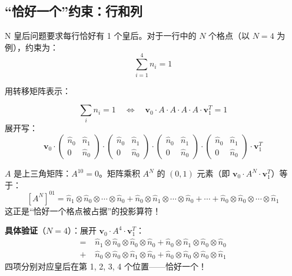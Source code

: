 \documentclass[12pt,a4paper]{article}
\begin{document}
\subsection{``恰好一个''约束：行和列}

N 皇后问题要求每行恰好有 1 个皇后。对于一行中的 $N$ 个格点（以 $N = 4$ 为例），约束为：
\[
\sum_{i=1}^{4} n_i = 1
\]

用转移矩阵表示：

\begin{keybox}[行/列约束]
\[
\sum_i n_i = 1 \quad \Longleftrightarrow \quad \mathbf{v}_0 \cdot A \cdot A \cdot A \cdot A \cdot \mathbf{v}_1^T = 1
\]
展开写：
\[
\mathbf{v}_0 \cdot
\begin{pmatrix} \hat{n}_0 & \hat{n}_1 \\ 0 & \hat{n}_0 \end{pmatrix} \cdot
\begin{pmatrix} \hat{n}_0 & \hat{n}_1 \\ 0 & \hat{n}_0 \end{pmatrix} \cdot
\begin{pmatrix} \hat{n}_0 & \hat{n}_1 \\ 0 & \hat{n}_0 \end{pmatrix} \cdot
\begin{pmatrix} \hat{n}_0 & \hat{n}_1 \\ 0 & \hat{n}_0 \end{pmatrix} \cdot
\mathbf{v}_1^T
\]
\end{keybox}

\begin{exbox}
$A$ 是上三角矩阵：$A^{10} = 0$。矩阵乘积 $A^N$ 的 $(0,1)$ 元素（即 $\mathbf{v}_0 \cdot A^N \cdot \mathbf{v}_1^T$）等于：
\[
[A^N]^{01} = \hat{n}_1 \otimes \hat{n}_0 \otimes \cdots \otimes \hat{n}_0 + \hat{n}_0 \otimes \hat{n}_1 \otimes \cdots \otimes \hat{n}_0 + \cdots + \hat{n}_0 \otimes \hat{n}_0 \otimes \cdots \otimes \hat{n}_1
\]
这正是``恰好一个格点被占据''的投影算符！

\medskip
\textbf{具体验证}（$N = 4$）：展开 $\mathbf{v}_0 \cdot A^4 \cdot \mathbf{v}_1^T$：
\begin{align*}
= \;& \hat{n}_1 \otimes \hat{n}_0 \otimes \hat{n}_0 \otimes \hat{n}_0 + \hat{n}_0 \otimes \hat{n}_1 \otimes \hat{n}_0 \otimes \hat{n}_0 \\
  +\;& \hat{n}_0 \otimes \hat{n}_0 \otimes \hat{n}_1 \otimes \hat{n}_0 + \hat{n}_0 \otimes \hat{n}_0 \otimes \hat{n}_0 \otimes \hat{n}_1
\end{align*}
四项分别对应皇后在第 1, 2, 3, 4 个位置——恰好一个！
\end{exbox}
\end{document}
